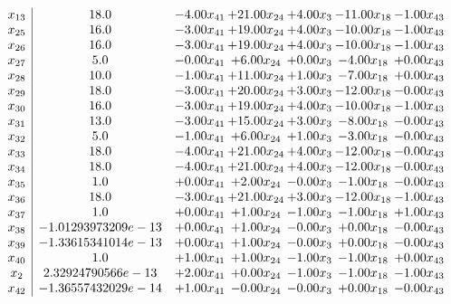 \documentclass[8pt]{article}
\begin{document}
\[\begin{array}{c| c c@{\hskip 2pt} c@{\hskip 2pt} c@{\hskip 2pt} c@{\hskip 2pt} c@{\hskip 2pt} }
 x_{13}   &  18.0 & -4.00 x_{41} & + 21.00 x_{24} & +  4.00 x_{3} & -11.00 x_{18} & -1.00 x_{43}\\
 x_{25}   &  16.0 & -3.00 x_{41} & + 19.00 x_{24} & +  4.00 x_{3} & -10.00 x_{18} & -1.00 x_{43}\\
 x_{26}   &  16.0 & -3.00 x_{41} & + 19.00 x_{24} & +  4.00 x_{3} & -10.00 x_{18} & -1.00 x_{43}\\
 x_{27}   &  5.0 & -0.00 x_{41} & +  6.00 x_{24} & +  0.00 x_{3} & -4.00 x_{18} & +  0.00 x_{43}\\
 x_{28}   &  10.0 & -1.00 x_{41} & + 11.00 x_{24} & +  1.00 x_{3} & -7.00 x_{18} & +  0.00 x_{43}\\
 x_{29}   &  18.0 & -3.00 x_{41} & + 20.00 x_{24} & +  3.00 x_{3} & -12.00 x_{18} & -0.00 x_{43}\\
 x_{30}   &  16.0 & -3.00 x_{41} & + 19.00 x_{24} & +  4.00 x_{3} & -10.00 x_{18} & -1.00 x_{43}\\
 x_{31}   &  13.0 & -3.00 x_{41} & + 15.00 x_{24} & +  3.00 x_{3} & -8.00 x_{18} & -0.00 x_{43}\\
 x_{32}   &  5.0 & -1.00 x_{41} & +  6.00 x_{24} & +  1.00 x_{3} & -3.00 x_{18} & -0.00 x_{43}\\
 x_{33}   &  18.0 & -4.00 x_{41} & + 21.00 x_{24} & +  4.00 x_{3} & -12.00 x_{18} & -0.00 x_{43}\\
 x_{34}   &  18.0 & -4.00 x_{41} & + 21.00 x_{24} & +  4.00 x_{3} & -12.00 x_{18} & -0.00 x_{43}\\
 x_{35}   &  1.0 & +  0.00 x_{41} & +  2.00 x_{24} & -0.00 x_{3} & -1.00 x_{18} & -0.00 x_{43}\\
 x_{36}   &  18.0 & -3.00 x_{41} & + 21.00 x_{24} & +  3.00 x_{3} & -12.00 x_{18} & -1.00 x_{43}\\
 x_{37}   &  1.0 & +  0.00 x_{41} & +  1.00 x_{24} & -1.00 x_{3} & -1.00 x_{18} & +  1.00 x_{43}\\
 x_{38}   &  -1.01293973209e-13 & +  0.00 x_{41} & +  1.00 x_{24} & -0.00 x_{3} & +  0.00 x_{18} & -0.00 x_{43}\\
 x_{39}   &  -1.33615341014e-13 & +  0.00 x_{41} & +  1.00 x_{24} & -0.00 x_{3} & +  0.00 x_{18} & -0.00 x_{43}\\
 x_{40}   &  1.0 & +  1.00 x_{41} & +  1.00 x_{24} & -1.00 x_{3} & -1.00 x_{18} & +  0.00 x_{43}\\
 x_{2}   &  2.32924790566e-13 & +  2.00 x_{41} & +  0.00 x_{24} & -1.00 x_{3} & -1.00 x_{18} & -1.00 x_{43}\\
 x_{42}   &  -1.36557432029e-14 & +  1.00 x_{41} & -0.00 x_{24} & -0.00 x_{3} & +  0.00 x_{18} & -0.00 x_{43}\\

\end{array}\]
\end{document}
